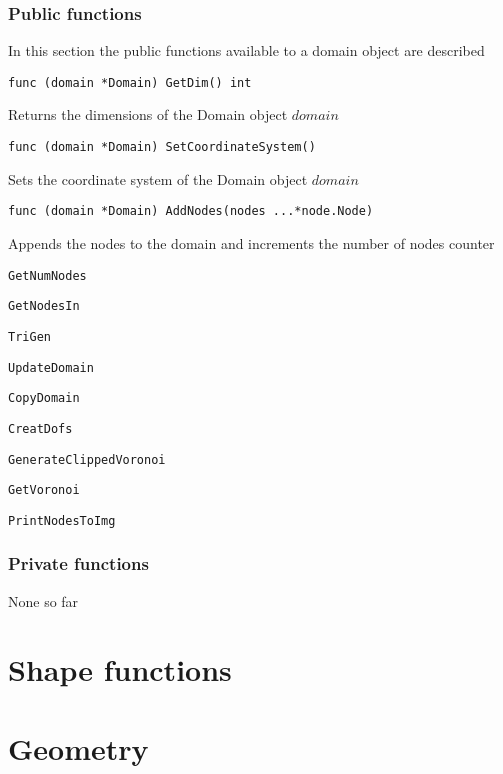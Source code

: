 \subsubsection*{Public functions}
In this section the public functions available to a domain object are described
\begin{lstlisting}
func (domain *Domain) GetDim() int 
\end{lstlisting}
Returns the dimensions of the Domain object $domain$
\begin{lstlisting}
func (domain *Domain) SetCoordinateSystem() 
\end{lstlisting}
Sets the coordinate system of the Domain object $domain$
\begin{lstlisting}
func (domain *Domain) AddNodes(nodes ...*node.Node) 
\end{lstlisting}
Appends the nodes to the domain and increments the number of nodes counter
\begin{lstlisting}
GetNumNodes
\end{lstlisting}
\begin{lstlisting}
GetNodesIn
\end{lstlisting}
\begin{lstlisting}
TriGen
\end{lstlisting}
\begin{lstlisting}
UpdateDomain
\end{lstlisting}
\begin{lstlisting}
CopyDomain
\end{lstlisting}
\begin{lstlisting}
CreatDofs
\end{lstlisting}
\begin{lstlisting}
GenerateClippedVoronoi
\end{lstlisting}

\begin{lstlisting}
GetVoronoi
\end{lstlisting}

\begin{lstlisting}
PrintNodesToImg
\end{lstlisting}

\subsubsection*{Private functions}
None so far


\section{Shape functions}


\section{Geometry}

